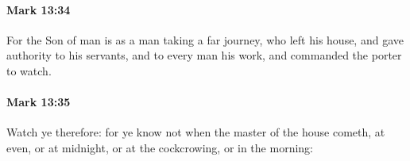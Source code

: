 		\paragraph{Mark 13:34} %
			\label{MARK-13-34}

			For the Son of man is as a man taking a far journey, who left his house, and gave authority to his servants, and to every man his work, and commanded the porter to watch.

			\begin{framed}
			\scriptsize
				\begin{compactdesc}
					\item[SBLG]  \hyperref[EXOUSIA]{}
				\end{compactdesc}
			\end{framed}

		\paragraph{Mark 13:35} %
			\label{MARK-13-35}

			Watch ye therefore: for ye know not when the master of the house cometh, at even, or at midnight, or at the cockcrowing, or in the morning:


